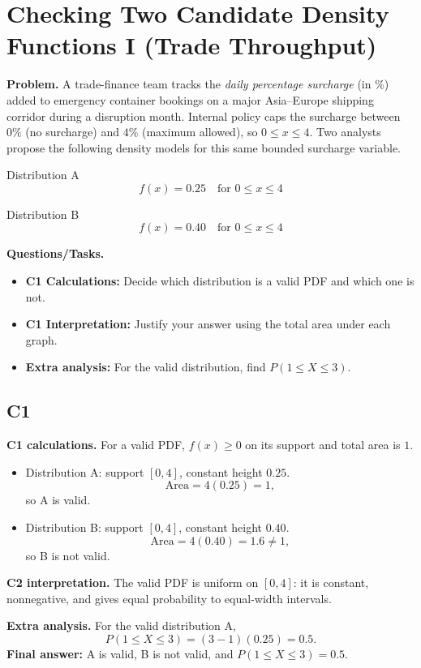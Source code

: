 	\section{Checking Two Candidate Density Functions I (Trade Throughput)}
	
	\textbf{Problem.}
	A trade-finance team tracks the \emph{daily percentage surcharge} (in \%) added to emergency container bookings on a major Asia--Europe shipping corridor during a disruption month. Internal policy caps the surcharge between $0\%$ (no surcharge) and $4\%$ (maximum allowed), so $0\le x\le 4$.
	Two analysts propose the following density models for this same bounded surcharge variable.
	
	Distribution A
	\[
	f(x)=0.25\quad\text{for }0\le x\le 4
	\]
	
	Distribution B
	\[
	f(x)=0.40\quad\text{for }0\le x\le 4
	\]
	
	\textbf{Questions/Tasks.}
	\begin{itemize}
		\item \textbf{C1 Calculations:} Decide which distribution is a valid PDF and which one is not.
		\item \textbf{C1 Interpretation:} Justify your answer using the total area under each graph.
		\item \textbf{Extra analysis:} For the valid distribution, find $P(1\le X\le 3)$.
	\end{itemize}

	\subsection*{C1}

\textbf{C1 calculations.}
For a valid PDF, $f(x)\ge 0$ on its support and total area is $1$.
\begin{itemize}
	\item Distribution A: support $[0,4]$, constant height $0.25$.
	\[
	\text{Area}=4(0.25)=1,
	\]
	so A is valid.
	\item Distribution B: support $[0,4]$, constant height $0.40$.
	\[
	\text{Area}=4(0.40)=1.6\ne1,
	\]
	so B is not valid.
\end{itemize}

\textbf{C2 interpretation.}
The valid PDF is uniform on $[0,4]$: it is constant, nonnegative, and gives equal probability to equal-width intervals.

\textbf{Extra analysis.}
For the valid distribution A,
\[
P(1\le X\le 3)=(3-1)(0.25)=0.5.
\]
\textbf{Final answer:} A is valid, B is not valid, and $P(1\le X\le 3)=0.5$.

